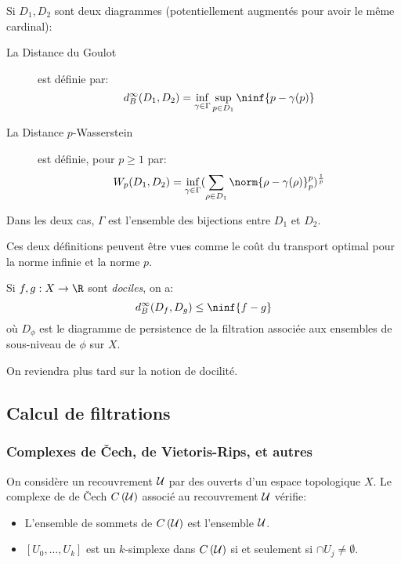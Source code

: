 \begin{definition}
	Si $D_{1}, D_{2}$ sont deux diagrammes (potentiellement augmentés pour avoir le même cardinal):
	\begin{description}
		\item[La Distance du Goulot] est définie par:
		      \begin{equation*}
			      d_{B}^{\infty}(D_{1}, D_{2}) = \inf_{\gamma \in \Gamma} \sup_{p \in D_{1}} \ninf{p - \gamma(p)}
		      \end{equation*}
		\item[La Distance $p$-Wasserstein] est définie, pour $p \geq 1$ par:
		      \begin{equation*}
			      W_{p}(D_{1}, D_{2}) = \inf_{\gamma \in \Gamma} (\sum_{\rho \in D_{1}} \norm{\rho - \gamma(\rho)}_{p}^{p})^{\frac{1}{p}}
		      \end{equation*}
	\end{description}
	Dans les deux cas, $\Gamma$ est l'ensemble des bijections entre $D_{1}$ et $D_{2}$.
\end{definition}

\begin{remarque}
	Ces deux définitions peuvent être vues comme le coût du transport optimal pour la norme infinie et la norme $p$.
\end{remarque}

\begin{thm}
	Si $f, g : X \to \R$ sont \emph{dociles}, on a:
	\begin{equation*}
		d_{B}^{\infty}(D_{f}, D_{g}) \leq \ninf{f - g}
	\end{equation*}
	où $D_{\phi}$ est le diagramme de persistence de la filtration associée aux ensembles de sous-niveau de $\phi$ sur $X$.
\end{thm}
On reviendra plus tard sur la notion de docilité.

\subsection{Calcul de filtrations}
\subsubsection{Complexes de Čech, de Vietoris-Rips, et autres}
\begin{definition}
	On considère un recouvrement $\mathcal{U}$ par des ouverts d'un espace topologique $X$.
	Le complexe de de Čech $C\left(\mathcal{U}\right)$ associé au recouvrement $\mathcal{U}$ vérifie:
	\begin{itemize}
		\item L'ensemble de sommets de $C\left(\mathcal{U}\right)$ est l'ensemble $\mathcal{U}$.
		\item $\left[U_{0}, \ldots, U_{k}\right]$ est un $k$-simplexe dans $C\left(\mathcal{U}\right)$ si et seulement si $\cap U_{j} \neq \emptyset$.
	\end{itemize}
\end{definition}

